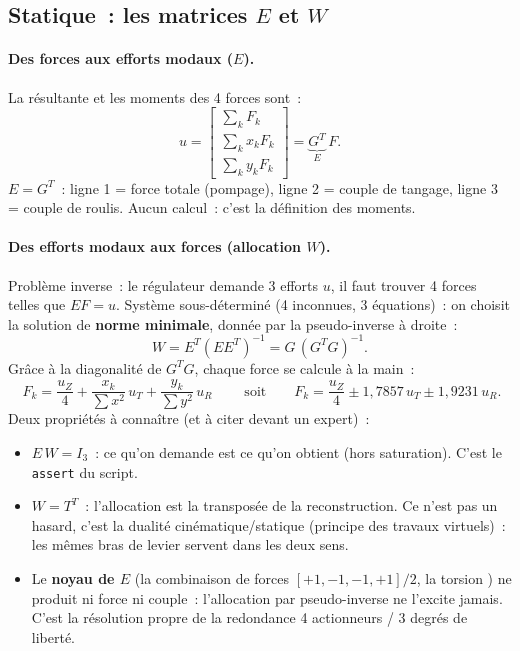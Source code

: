 \documentclass[a4paper,11pt]{article}
\begin{document}
\subsection{Statique~: les matrices $E$ et $W$}
\label{subsec:statique}

\paragraph{Des forces aux efforts modaux ($E$).}
La résultante et les moments des 4 forces sont~:
\begin{equation}
    u = \begin{bmatrix} \sum_k F_k \\ \sum_k x_k F_k \\ \sum_k y_k F_k \end{bmatrix}
      = \underbrace{G^T}_{E}\,F .
\end{equation}
$E = G^T$~: ligne 1 = force totale (pompage), ligne 2 = couple de tangage,
ligne 3 = couple de roulis. Aucun calcul~: c'est la définition des moments.

\paragraph{Des efforts modaux aux forces (allocation $W$).}
Problème inverse~: le régulateur demande 3 efforts $u$, il faut trouver 4
forces telles que $E F = u$. Système sous-déterminé (4 inconnues, 3
équations)~: on choisit la solution de \textbf{norme minimale}, donnée par la
pseudo-inverse à droite~:
\begin{equation}
    W = E^T (E E^T)^{-1} = G\,(G^T G)^{-1}.
\end{equation}
Grâce à la diagonalité de $G^T G$, chaque force se calcule à la main~:
\begin{equation}
    \boxed{\;F_k = \frac{u_Z}{4} + \frac{x_k}{\sum x^2}\,u_T
    + \frac{y_k}{\sum y^2}\,u_R\;}
    \qquad\text{soit}\qquad
    F_k = \frac{u_Z}{4} \pm 1{,}7857\,u_T \pm 1{,}9231\,u_R .
\end{equation}
Deux propriétés à connaître (et à citer devant un expert)~:
\begin{itemize}
    \item $E\,W = I_3$~: ce qu'on demande est ce qu'on obtient (hors
          saturation). C'est le \texttt{assert} du script.
    \item $W = T^T$~: l'allocation est la transposée de la reconstruction.
          Ce n'est pas un hasard, c'est la dualité cinématique/statique
          (principe des travaux virtuels)~: les mêmes bras de levier servent
          dans les deux sens.
    \item Le \textbf{noyau de $E$} (la combinaison de forces
          $[+1,-1,-1,+1]/2$, la \og torsion \fg) ne produit ni force ni couple~:
          l'allocation par pseudo-inverse ne l'excite jamais. C'est la
          résolution propre de la redondance 4 actionneurs / 3 degrés de
          liberté.
\end{itemize}
\end{document}
